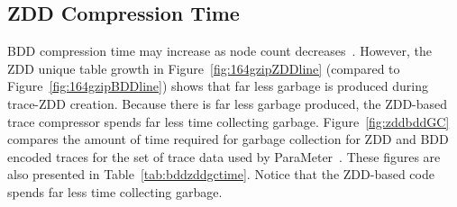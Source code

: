 {\subsection{ZDD Compression Time}

BDD compression time may increase as node count decreases~\cite{price:08:msthesis}. However, the ZDD unique table growth in Figure~\ref{fig:164gzipZDDline} (compared to Figure~\ref{fig:164gzipBDDline}) shows that far less garbage is produced during trace-ZDD creation. Because there is far less garbage produced, the ZDD-based trace compressor spends far less time collecting garbage. Figure~\ref{fig:zddbddGC} compares the amount of time required for garbage collection for ZDD and BDD encoded traces for the set of trace data used by ParaMeter~\cite{price:08:pact}. These figures are also presented in Table~\ref{tab:bddzddgctime}. Notice that the ZDD-based code spends far less time collecting garbage.

}

